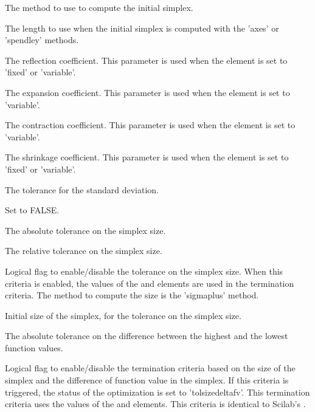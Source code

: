 \begin{Arguments}
\begin{ldescription}
\begin{description}
\end{description}


\item[\code{simplex0method}] The method to use to compute the initial simplex.
\item[\code{simplex0length}] The length to use when the initial simplex is computed
with the 'axes' or 'spendley' methods.
\item[\code{rho}] The reflection coefficient. This parameter is used when the
 element is set to 'fixed' or 'variable'.
\item[\code{chi}] The expansion coefficient. This parameter is used when the
 element is set to 'variable'.
\item[\code{gamma}] The contraction coefficient. This parameter is used when the
 element is set to 'variable'.
\item[\code{sigma}] The shrinkage coefficient. This parameter is used when the
 element is set to 'fixed' or 'variable'.
\item[\code{tolfstdeviation}] The tolerance for the standard deviation.
\item[\code{tolfstdeviationmethod}] Set to FALSE.
\item[\code{tolsimplexizeabsolute}] The absolute tolerance on the simplex size.
\item[\code{tolsimplexizerelative}] The relative tolerance on the simplex size.
\item[\code{tolsimplexizemethod}] Logical flag to enable/disable the tolerance on
the simplex size. When this criteria is enabled, the values of the
 and  elements are
used in the termination criteria. The method to compute the size is the
'sigmaplus' method.
\item[\code{simplexsize0}] Initial size of the simplex, for the tolerance on the
simplex size.
\item[\code{toldeltafv}] The absolute tolerance on the difference between the
highest and the lowest function values.
\item[\code{tolssizedeltafvmethod}] Logical flag to enable/disable the termination
criteria based on the size of the simplex and the difference of function
value in the simplex. If this criteria is triggered, the status of the
optimization is set to 'tolsizedeltafv'. This termination criteria uses
the values of the  and 
elements. This criteria is identical to Scilab's .

\end{ldescription}
\end{Arguments}
